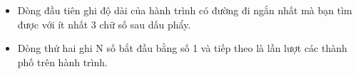\begin{itemize}
	\item Dòng đầu tiên ghi độ dài của hành trình có đường đi ngắn nhất mà bạn tìm được với ít nhất 3 chữ số sau dấu phẩy.
	\item Dòng thứ hai ghi N số bắt đầu bằng số 1 và tiếp theo là lần lượt các thành phố trên hành trình.
\end{itemize}